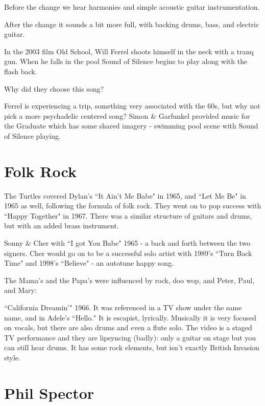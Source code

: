 \documentclass[12pt, a4paper, twoside, openright, titlepage]{book}
\begin{document}
Before the change we hear harmonies and simple acoustic guitar instrumentation.

After the change it sounds a bit more full, with backing drums, bass, and electric guitar.


\begin{eg}{}{}
    In the 2003 film Old School, Will Ferrel shoots himself in the neck with a tranq gun. When he falls in the pool Sound of Silence begins to play along with the flash back.
    \begin{qst}{}{}
        Why did they choose this song?
    \end{qst}
    Ferrel is experiencing a trip, something very associated with the 60s, but why not pick a more psychadelic centered song? Simon \& Garfunkel provided music for the Graduate which has some shared imagery - swimming pool scene with Sound of Silence playing.
\end{eg}


\section{Folk Rock}

The Turtles covered Dylan's ``It Ain't Me Babe" in 1965, and ``Let Me Be" in 1965 as well, following the formula of folk rock. They went on to pop success with ``Happy Together" in 1967. There was a similar structure of guitars and drums, but with an added brass instrument.

Sonny \& Cher with ``I got You Babe" 1965 - a back and forth between the two signers. Cher would go on to be a successful solo artist with 1989's ``Turn Back Time" and 1998's ``Believe" - an autotune happy song. 


The Mama's and the Papa's were influenced by rock, doo wop, and Peter, Paul, and Mary: 

\begin{eg}{}{}
    ``California Dreamin'" 1966. It was referenced in a TV show under the same name, and in Adele's ``Hello." It is escapist, lyrically. Musically it is very focused on vocals, but there are also drums and even a flute solo. The video is a staged TV performance and they are lipsyncing (badly): only a guitar on stage but you can still hear drums. It has some rock elements, but isn't exactly British Invasion style.
\end{eg}


\section{Phil Spector}
\end{document}
